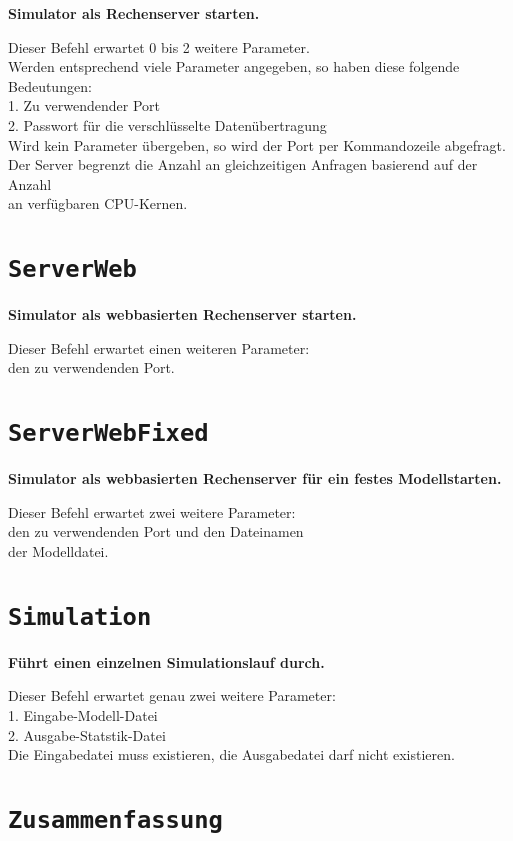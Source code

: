 \textbf{Simulator als Rechenserver starten.}

Dieser Befehl erwartet 0 bis 2 weitere Parameter.\\
Werden entsprechend viele Parameter angegeben, so haben diese folgende Bedeutungen:\\
1. Zu verwendender Port\\
2. Passwort für die verschlüsselte Datenübertragung\\
Wird kein Parameter übergeben, so wird der Port per Kommandozeile abgefragt.\\
Der Server begrenzt die Anzahl an gleichzeitigen Anfragen basierend auf der Anzahl\\
an verfügbaren CPU-Kernen.

\section{\texttt{ServerWeb}}

\textbf{Simulator als webbasierten Rechenserver starten.}

Dieser Befehl erwartet einen weiteren Parameter:\\
den zu verwendenden Port.

\section{\texttt{ServerWebFixed}}

\textbf{Simulator als webbasierten Rechenserver für ein festes Modellstarten.}

Dieser Befehl erwartet zwei weitere Parameter:\\
den zu verwendenden Port und den Dateinamen\\
der Modelldatei.

\section{\texttt{Simulation}}

\textbf{Führt einen einzelnen Simulationslauf durch.}

Dieser Befehl erwartet genau zwei weitere Parameter:\\
1. Eingabe-Modell-Datei\\
2. Ausgabe-Statstik-Datei\\
Die Eingabedatei muss existieren, die Ausgabedatei darf nicht existieren.

\section{\texttt{Zusammenfassung}}

